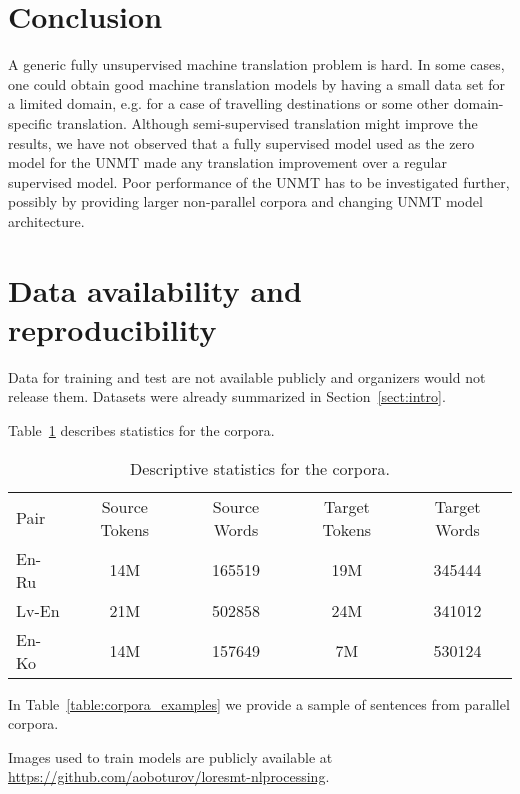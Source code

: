 \documentclass[]{article}
\begin{document}

\section{Conclusion}

A generic fully unsupervised machine translation problem is hard.
In some cases, one could obtain good machine translation models by having a small data set for a limited domain, e.g. for a case of travelling destinations or some other domain-specific translation.
Although semi-supervised translation might improve the results, we have not observed that a fully supervised model used as the zero model for the UNMT made any translation improvement over a regular supervised model.
Poor performance of the UNMT has to be investigated further, possibly by providing larger non-parallel corpora and changing UNMT model architecture.

\section{Data availability and reproducibility}
\label{sect:data}

Data for training and test are not available publicly and organizers would not release them.
Datasets were already summarized in Section~\ref{sect:intro}.

Table~\ref{table:corpora_stats} describes statistics for the corpora.

\begin{table}[h!]
\begin{center}
\begin{tabular}{ l c c c c }
Pair & Source Tokens & Source Words & Target Tokens & Target Words \\
En-Ru & 14M & 165519 & 19M & 345444 \\
Lv-En & 21M & 502858 & 24M & 341012 \\
En-Ko & 14M & 157649 & 7M & 530124 \\
\end{tabular}
\end{center}
\caption{Descriptive statistics for the corpora.}
\label{table:corpora_stats}
\end{table}

In Table~\ref{table:corpora_examples} we provide a sample of sentences from parallel corpora.

Images used to train models are publicly available at \url{https://github.com/aoboturov/loresmt-nlprocessing}.
\end{document}
